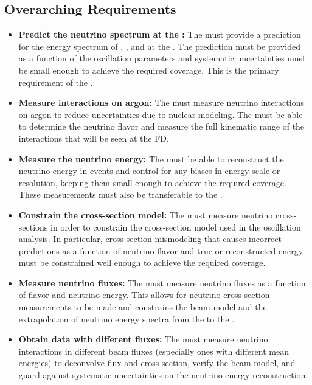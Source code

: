 \subsection{Overarching Requirements}

\begin{itemize}
    \item {{\bf Predict the neutrino spectrum at the :}} The  must provide a prediction for the energy spectrum of \numu, \anumu, \nue and \anue at the . The prediction must be provided as a function of the oscillation parameters and systematic uncertainties must be small enough to achieve the required  coverage. This is the primary requirement of the  .
    
    \item{{\bf Measure interactions on argon:}} The  must measure neutrino interactions on argon to reduce uncertainties due to nuclear modeling. The  must be able to determine the neutrino flavor and measure the full kinematic range of the interactions that will be seen at the FD.
    
    \item{{\bf Measure the neutrino energy:}} The  must be able to reconstruct the neutrino energy in  events and control for any biases in energy scale or resolution, keeping them small enough to achieve the required  coverage. These measurements must also be transferable to the . 
    
    \item{{\bf Constrain the cross-section model:}} The  must measure neutrino cross-sections in order to constrain the cross-section model used in the oscillation analysis. In particular, cross-section mismodeling that causes incorrect  predictions as a function of neutrino flavor and true or reconstructed energy must be constrained well enough to achieve the required  coverage. 
    
    \item{{\bf Measure neutrino fluxes:}} The  must measure neutrino fluxes as a function of flavor and neutrino energy. This allows for neutrino cross section measurements to be made and constrains the beam model and the extrapolation of neutrino energy spectra from the  to the .
    
    \item{{\bf Obtain data with different fluxes:}} The  must measure neutrino interactions in different beam fluxes (especially ones with different mean energies) to deconvolve flux and cross section, verify the beam model, and guard against systematic uncertainties on the neutrino energy reconstruction.
    

\end{itemize}
